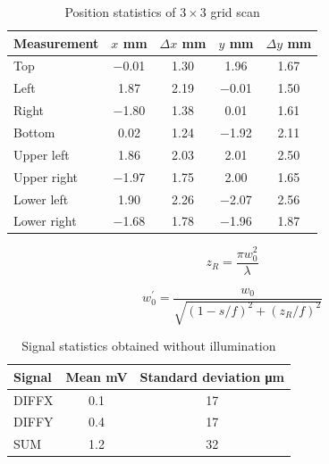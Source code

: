 
\begin{table}[htb]
  \centering
  \begin{tabular}{lcccc}
    \toprule
      Measurement &
      $x$ \si{\milli\meter} &
      $\Delta x$ \si{\milli\meter} &
      $y$ \si{\milli\meter} &
      $\Delta y$ \si{\milli\meter}\\
    \midrule
      Top & \num{-0.01} & \num{+1.30} & \num{+1.96} & \num{+1.67} \\      
      Left & \num{1.87} & \num{+2.19} & \num{-0.01} & \num{+1.50} \\      
      Right & \num{-1.80} & \num{+1.38} & \num{+0.01} & \num{+1.61} \\
      Bottom & \num{0.02} & \num{+1.24} & \num{-1.92} & \num{+2.11} \\
      Upper left & \num{+1.86} & \num{+2.03} & \num{+2.01} & \num{+2.50} \\
      Upper right & \num{-1.97} & \num{+1.75} & \num{+2.00} & \num{+1.65} \\
      Lower left & \num{+1.90} & \num{+2.26} & \num{-2.07} & \num{+2.56} \\
      Lower right & \num{-1.68} & \num{+1.78} & \num{-1.96} & \num{+1.87} \\
    \bottomrule
  \end{tabular}
  \captionsetup{width=.8\textwidth}
  \caption{Position statistics of $3\times 3$ grid scan}\label{tab:grid_scan_position_statistics}
\end{table}

\begin{equation}
	z_R=\frac{\pi w_0^2}{\lambda}
	\label{eq:rayleigh_length}
\end{equation}

\begin{equation}
	w^\prime_0=\frac{w_0}{\sqrt{(1-s/f)^2+(z_R/f)^2}}
	\label{eq:beam_waist_thin_lens}
\end{equation}

\begin{table}[htb]
  \centering
  \begin{tabular}{lcc}
    \toprule
      Signal &
      Mean \si{\milli\volt} &
      Standard deviation \si{\micro\meter} \\
    \midrule
      DIFFX & \num{0.1} & \num{17} \\
      DIFFY & \num{0.4} & \num{17} \\
      SUM & \num{1.2} & \num{32} \\
    \bottomrule
  \end{tabular}
  \captionsetup{width=.8\textwidth}
  \caption{Signal statistics obtained without illumination}\label{tab:grid_scan_signal_statistics}
\end{table}

